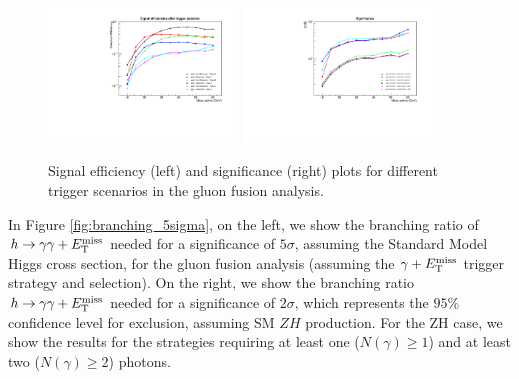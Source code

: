 \begin{figure}[htbp]
\centering
\includegraphics[width=0.45\textwidth]{triggerplots/Efficiencies.pdf}
\includegraphics[width=0.45\textwidth]{triggerplots/Significance.pdf}
\caption{Signal efficiency (left) and significance (right) plots for different trigger scenarios in the gluon fusion analysis.}
\label{fig:triggers}
\end{figure}




In Figure \ref{fig:branching_5sigma}, on the left, we show the branching ratio of $h\rightarrow\gamma\gamma+E_{\mathrm{T}}^{\text{miss}}$ needed for a significance of $5\sigma$, assuming the Standard Model Higgs cross section, for the gluon fusion analysis (assuming the $\gamma+E_{\mathrm{T}}^{\text{miss}}$ trigger strategy and selection). On the right, we show the branching ratio $h\rightarrow\gamma\gamma+E_{\mathrm{T}}^{\text{miss}}$ needed for a significance of $2\sigma$, which represents the $95\%$ confidence level for exclusion, assuming SM $ZH$ production. For the ZH case, we show the results for the strategies requiring at least one ($N(\gamma) \geq 1$) and at least two ($N(\gamma) \geq 2$) photons. %

